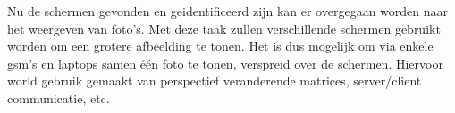 Nu de schermen gevonden en geidentificeerd zijn kan er overgegaan worden naar het weergeven van foto's. Met deze taak zullen verschillende schermen gebruikt worden om een grotere afbeelding te tonen. Het is dus mogelijk om via enkele gsm's en laptops samen één foto te tonen, verspreid over de schermen. Hiervoor world gebruik gemaakt van perspectief veranderende matrices, server/client communicatie, etc.